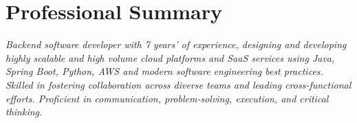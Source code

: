 \section{Professional Summary}
\small
\textit{Backend software developer with 7 years' of experience, designing and developing highly scalable and high volume cloud platforms and SaaS services using Java, Spring Boot, Python, AWS and modern software engineering best practices. Skilled in fostering collaboration across diverse teams and leading cross-functional efforts. Proficient in communication, problem-solving, execution, and critical thinking.}